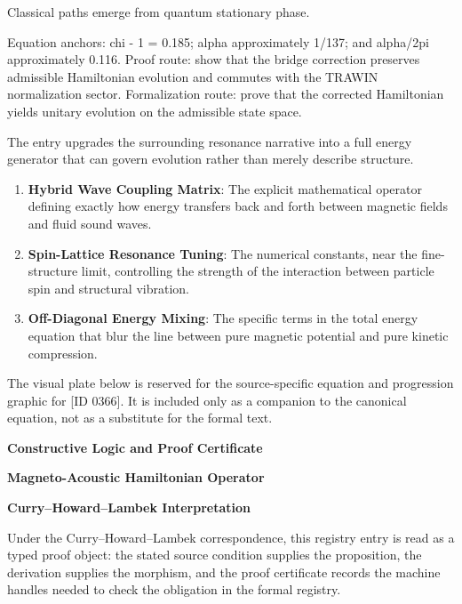 Classical paths emerge from quantum stationary phase.

Equation anchors: chi - 1 = 0.185; alpha approximately 1/137; and alpha/2pi approximately 0.116. Proof route: show that the bridge correction preserves admissible Hamiltonian evolution and commutes with the TRAWIN normalization sector. Formalization route: prove that the corrected Hamiltonian yields unitary evolution on the admissible state space.

The entry upgrades the surrounding resonance narrative into a full energy generator that can govern evolution rather than merely describe structure.
\endgroup

\begin{enumerate}[leftmargin=1.6em,itemsep=6pt,topsep=4pt]
\item \textbf{Hybrid Wave Coupling Matrix}: The explicit mathematical operator defining exactly how energy transfers back and forth between magnetic fields and fluid sound waves.
\item \textbf{Spin-Lattice Resonance Tuning}: The numerical constants, near the fine-structure limit, controlling the strength of the interaction between particle spin and structural vibration.
\item \textbf{Off-Diagonal Energy Mixing}: The specific terms in the total energy equation that blur the line between pure magnetic potential and pure kinetic compression.
\end{enumerate}

\begingroup\footnotesize\sloppy
The visual plate below is reserved for the source-specific equation and progression graphic for [ID 0366]. It is included only as a companion to the canonical equation, not as a substitute for the formal text.
\par\endgroup
\ifTZPDarkEdition
{}
\fi

\clearpage
\begingroup\tzpsupportsetup
\noindent\textbf{\fontsize{10.8pt}{12.8pt}\selectfont [ID 0366] Constructive Logic and Proof Certificate}\par
\noindent\textbf{\fontsize{10pt}{12pt}\selectfont Magneto-Acoustic Hamiltonian Operator}\par
\vspace{0.45em}
\begingroup
\footnotesize
\setlength{\parskip}{0.22em}
\setlength{\parindent}{0pt}
\noindent\textbf{Curry--Howard--Lambek Interpretation}\par
Under the Curry--Howard--Lambek correspondence, this registry entry is read as a typed proof
object: the stated source condition supplies the proposition, the derivation supplies the
morphism, and the proof certificate records the machine handles needed to check the obligation
in the formal registry.

